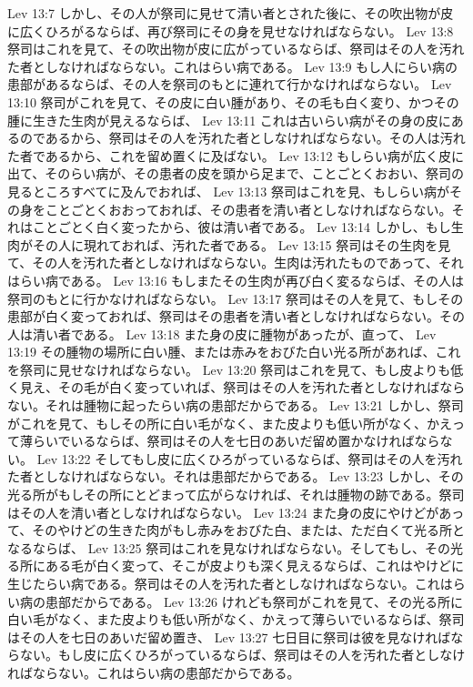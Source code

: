 Lev 13:7  しかし、その人が祭司に見せて清い者とされた後に、その吹出物が皮に広くひろがるならば、再び祭司にその身を見せなければならない。
Lev 13:8  祭司はこれを見て、その吹出物が皮に広がっているならば、祭司はその人を汚れた者としなければならない。これはらい病である。
Lev 13:9  もし人にらい病の患部があるならば、その人を祭司のもとに連れて行かなければならない。
Lev 13:10  祭司がこれを見て、その皮に白い腫があり、その毛も白く変り、かつその腫に生きた生肉が見えるならば、
Lev 13:11  これは古いらい病がその身の皮にあるのであるから、祭司はその人を汚れた者としなければならない。その人は汚れた者であるから、これを留め置くに及ばない。
Lev 13:12  もしらい病が広く皮に出て、そのらい病が、その患者の皮を頭から足まで、ことごとくおおい、祭司の見るところすべてに及んでおれば、
Lev 13:13  祭司はこれを見、もしらい病がその身をことごとくおおっておれば、その患者を清い者としなければならない。それはことごとく白く変ったから、彼は清い者である。
Lev 13:14  しかし、もし生肉がその人に現れておれば、汚れた者である。
Lev 13:15  祭司はその生肉を見て、その人を汚れた者としなければならない。生肉は汚れたものであって、それはらい病である。
Lev 13:16  もしまたその生肉が再び白く変るならば、その人は祭司のもとに行かなければならない。
Lev 13:17  祭司はその人を見て、もしその患部が白く変っておれば、祭司はその患者を清い者としなければならない。その人は清い者である。
Lev 13:18  また身の皮に腫物があったが、直って、
Lev 13:19  その腫物の場所に白い腫、または赤みをおびた白い光る所があれば、これを祭司に見せなければならない。
Lev 13:20  祭司はこれを見て、もし皮よりも低く見え、その毛が白く変っていれば、祭司はその人を汚れた者としなければならない。それは腫物に起ったらい病の患部だからである。
Lev 13:21  しかし、祭司がこれを見て、もしその所に白い毛がなく、また皮よりも低い所がなく、かえって薄らいでいるならば、祭司はその人を七日のあいだ留め置かなければならない。
Lev 13:22  そしてもし皮に広くひろがっているならば、祭司はその人を汚れた者としなければならない。それは患部だからである。
Lev 13:23  しかし、その光る所がもしその所にとどまって広がらなければ、それは腫物の跡である。祭司はその人を清い者としなければならない。
Lev 13:24  また身の皮にやけどがあって、そのやけどの生きた肉がもし赤みをおびた白、または、ただ白くて光る所となるならば、
Lev 13:25  祭司はこれを見なければならない。そしてもし、その光る所にある毛が白く変って、そこが皮よりも深く見えるならば、これはやけどに生じたらい病である。祭司はその人を汚れた者としなければならない。これはらい病の患部だからである。
Lev 13:26  けれども祭司がこれを見て、その光る所に白い毛がなく、また皮よりも低い所がなく、かえって薄らいでいるならば、祭司はその人を七日のあいだ留め置き、
Lev 13:27  七日目に祭司は彼を見なければならない。もし皮に広くひろがっているならば、祭司はその人を汚れた者としなければならない。これはらい病の患部だからである。
